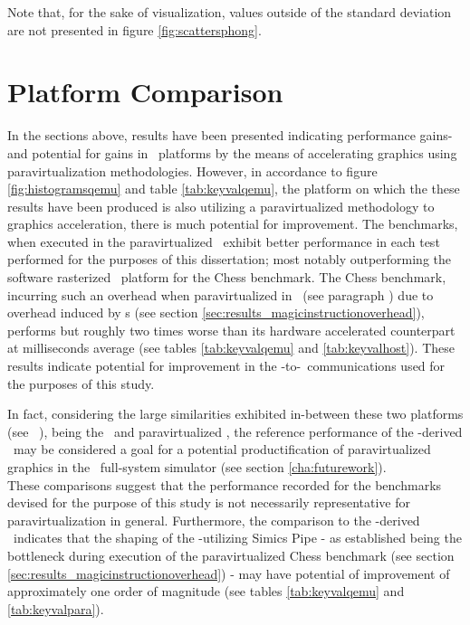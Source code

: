 \noindent
Note that, for the sake of visualization, values outside of the standard deviation are not presented in figure \ref{fig:scattersphong}.




\section{Platform Comparison}
\label{sec:analysisexperiment_platformcomparison}
In the sections above, results have been presented indicating performance gains- and potential for gains in \dvttermsimics\ platforms by the means of accelerating graphics using paravirtualization methodologies.
However, in accordance to figure \ref{fig:histogramsqemu} and table \ref{tab:keyvalqemu}, the platform on which the these results have been produced is also utilizing a paravirtualized methodology to graphics acceleration, there is much potential for improvement.
The benchmarks, when executed in the paravirtualized \dvttermandroidemulator\ exhibit better performance in each test performed for the purposes of this dissertation; most notably outperforming the software rasterized \dvttermsimics\ platform for the Chess benchmark.
The Chess benchmark, incurring such an overhead when paravirtualized in \dvttermsimics\ (see paragraph ) due to overhead induced by \dvttermmagicinstruction s (see section \ref{sec:results_magicinstructionoverhead}), performs but roughly two times worse than its hardware accelerated counterpart at  milliseconds average (see tables \ref{tab:keyvalqemu} and \ref{tab:keyvalhost}).
These results indicate potential for improvement in the \dvttermtarget -to-\dvttermhost\ communications used for the purposes of this study.

In fact, considering the large similarities exhibited in-between these two platforms (see ~), being the \dvttermandroidemulator\ and paravirtualized \dvttermsimics , the reference performance of the \dvttermqemu -derived \dvttermandroidemulator\ may be considered a goal for a potential productification of paravirtualized graphics in the \dvttermsimics\ full-system simulator (see section \ref{cha:futurework}).\\

\noindent
These comparisons suggest that the performance recorded for the benchmarks devised for the purpose of this study is not necessarily representative for paravirtualization in general.
Furthermore, the comparison to the \dvttermqemu -derived \dvttermandroidemulator\ indicates that the shaping of the \dvttermmagicinstruction -utilizing Simics Pipe - as established being the bottleneck during execution of the paravirtualized Chess benchmark (see section \ref{sec:results_magicinstructionoverhead}) - may have potential of improvement of approximately one order of magnitude (see tables \ref{tab:keyvalqemu} and \ref{tab:keyvalpara}).

